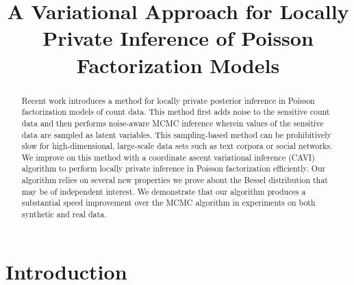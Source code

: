 \documentclass{article}
\title{A Variational Approach for Locally Private Inference of Poisson Factorization Models}
\author{} %
\begin{document}
\maketitle

\begin{abstract}
  Recent work  \cite{schein2018locally} introduces a method for locally private
  posterior inference in Poisson factorization models of count data. This method
  first adds  noise to the sensitive count data and then
  performs noise-aware MCMC inference wherein values of the sensitive data are
  sampled as latent variables. This sampling-based method can be prohibitively
  slow for high-dimensional, large-scale data sets such as text corpora or
  social networks. We improve on this method with a coordinate ascent
  variational inference (CAVI) algorithm to perform locally private inference in
  Poisson factorization efficiently. Our algorithm relies on several new
  properties we prove about the Bessel distribution that may be of independent
  interest. We demonstrate that our algorithm produces a substantial speed
  improvement over the MCMC algorithm in experiments on both
  synthetic and real data.
\end{abstract}

  \section{Introduction}
\end{document}
